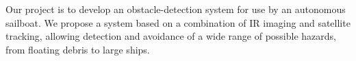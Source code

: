 Our project is to develop an obstacle-detection system for use by an autonomous sailboat.  We propose a system based on a combination of IR imaging and satellite tracking, allowing detection and avoidance of a wide range of possible hazards, from floating debris to large ships.  